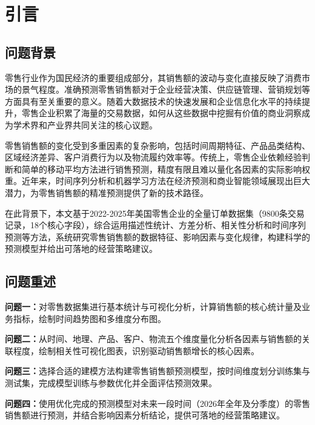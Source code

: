 

\section{引言}
\subsection{问题背景}

零售行业作为国民经济的重要组成部分，其销售额的波动与变化直接反映了消费市场的景气程度。准确预测零售销售额对于企业经营决策、供应链管理、营销规划等方面具有至关重要的意义。随着大数据技术的快速发展和企业信息化水平的持续提升，零售企业积累了海量的交易数据，如何从这些数据中挖掘有价值的商业洞察成为学术界和产业界共同关注的核心议题。

零售销售额的变化受到多重因素的复杂影响，包括时间周期特征、产品品类结构、区域经济差异、客户消费行为以及物流履约效率等。传统上，零售企业依赖经验判断和简单的移动平均方法进行销售预测，精度有限且难以量化各因素的实际影响权重。近年来，时间序列分析和机器学习方法在经济预测和商业智能领域展现出巨大潜力，为零售销售额的精准预测提供了新的技术路径。

在此背景下，本文基于2022-2025年美国零售企业的全量订单数据集（9800条交易记录，18个核心字段），综合运用描述性统计、方差分析、相关性分析和时间序列预测等方法，系统研究零售销售额的数据特征、影响因素与变化规律，构建科学的预测模型并给出可落地的经营策略建议。

\subsection{问题重述}

\textbf{问题一：}对零售数据集进行基本统计与可视化分析，计算销售额的核心统计量及业务指标，绘制时间趋势图和多维度分布图。

\textbf{问题二：}从时间、地理、产品、客户、物流五个维度量化分析各因素与销售额的关联程度，绘制相关性可视化图表，识别驱动销售额增长的核心因素。

\textbf{问题三：}选择合适的建模方法构建零售销售额预测模型，按时间维度划分训练集与测试集，完成模型训练与参数优化并全面评估预测效果。

\textbf{问题四：}使用优化完成的预测模型对未来一段时间（2026年全年及分季度）的零售销售额进行预测，并结合影响因素分析结论，提供可落地的经营策略建议。
